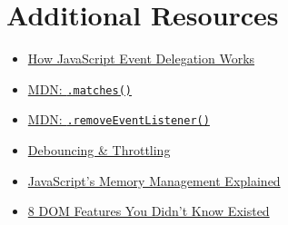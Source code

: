 \section{Additional Resources}

\begin{itemize}[leftmargin=*]
    \item \href{https://davidwalsh.name/event-delegate}{How JavaScript Event Delegation Works}
    \item \href{https://developer.mozilla.org/en-US/docs/Web/API/Element/matches}{MDN: \texttt{.matches()}}
    \item \href{https://developer.mozilla.org/en-US/docs/Web/API/EventTarget/removeEventListener}{MDN: \texttt{.removeEventListener()}}
    \item \href{https://css-tricks.com/debouncing-throttling-explained-examples/}{Debouncing \& Throttling}
    \item \href{https://felixgerschau.com/javascript-memory-management/}{JavaScript's Memory Management Explained}
    \item \href{https://blog.logrocket.com/8-dom-features-you-didnt-know-existed-ec2a0a28fd89/}{8 DOM Features You Didn't Know Existed}
\end{itemize}
